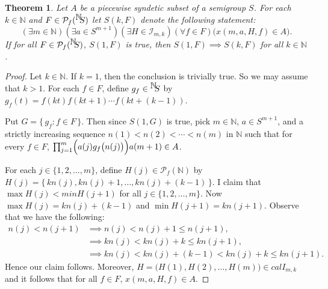 \documentclass[12pt]{article}
\theoremstyle{plain}
\newtheorem*{thm}{Theorem}
\theoremstyle{definition}
\newcommand{\bbN}{\mathbb{N}}
\newcommand{\calI}{\mathcal{I}}
\newcommand{\Pf}{\mathcal{P}_f}
\newcommand{\setfunc}[2]{\hbox{${}^{\hbox{$#1$}}\hskip -3 pt #2$}}
\begin{document}
\begin{thm}
  Let $A$ be a piecewise syndetic subset of a semigroup $S$.
  For each $k \in \bbN$ and $F \in \Pf(\setfunc{\bbN}{S})$ let $S(k,
  F)$ denote the following statement:
  \[
    (\exists m \in \bbN) (\exists a \in S^{m+1}) (\exists H \in
    \calI_{m,k}) (\forall f \in F) \bigl( x(m, a, H, f) \in A \bigr).
  \]
  If for all $F \in \Pf(\setfunc{\bbN}{S})$, $S(1,F)$ is true,
  then $S(1, F) \implies S(k, F)$ for all $k \in \bbN$.
\end{thm}
\begin{proof}
  Let $k \in \bbN$.
  If $k = 1$, then the conclusion is trivially true.
  So we may assume that $k > 1$.
  For each $f \in F$, define $g_f \in \setfunc{\bbN}{S}$ by $g_f(t) =
  f(k t) f(k t+1) \cdots f(k t+(k-1))$. 
  
  Put $G = \{\, g_f : f \in F \,\}$.
  Then since $S(1, G)$ is true, pick $m \in \bbN$, $a \in S^{m+1}$,
  and a strictly increasing sequence $n(1) < n(2) < \cdots < n(m)$ in
  $\bbN$ such that for every $f \in F$,
  $\prod_{j=1}^m\Bigl(a(j)g_f \bigl(n(j)\bigr)\Bigr) a(m+1) \in A$. 

  For each $j \in \{1, 2, \ldots, m\}$, define $H(j) \in \Pf(\bbN)$ by
  $H(j) = \{\, k  n(j), k n(j) + 1, \ldots, k n(j) + (k-1) \,\}$. 
  I claim that $\max H(j) < min H(j+1)$ for all $j \in \{1, 2, \ldots,
  m\}$. 
  Now $\max H(j) = k n(j) + (k-1)$ and $\min H(j+1) = k n(j+1)$. 
  Observe that we have the following:
  \begin{align*}
    n(j) < n(j+1) &\implies n(j) < n(j) + 1 \le n(j+1), \\
    &\implies k n(j) < k n(j) + k \le k n(j+1), \\
    &\implies k n(j) < k n(j) + (k-1) < k n(j) + k \le k n(j+1).
  \end{align*}
  Hence our claim follows.
  Moreover, $H = \bigl(H(1), H(2), \ldots, H(m) \bigr) \in
  calI_{m,k}$ and it follows that for all $f \in F$, $x(m, a, H, f)
  \in A$.
\end{proof}
\end{document}
